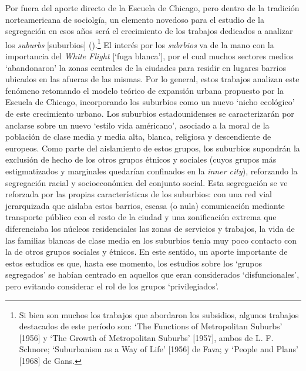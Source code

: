 \documentclass[
  spanish,
  a4paper,%
  chapterprefix=true,%
  DIV=calc,%
  twoside]{scrbook}%
\begin{document}
Por fuera del aporte directo de la Escuela de Chicago, pero dentro de la
tradición norteamericana de sociolgía, un
elemento novedoso para el estudio de la segregación en esos años será el
crecimiento de los trabajos dedicados a analizar los \emph{suburbs}
{[}suburbios{]} ().\footnote{Si bien son muchos los trabajos que abordaron los
  subsidios, algunos trabajos destacados de este período son: `The
  Functions of Metropolitan Suburbs' {[}1956{]} y `The Growth of
  Metropolitan Suburbs' {[}1957{]}, ambos de L. F. Schnore; `Suburbanism
  as a Way of Life' {[}1956{]} de Fava; y `People and Plans' {[}1968{]} de
  Gans.} El
interés por los \emph{subrbios} va de la mano con la importancia del \emph{White
Flight} {[}`fuga blanca'{]}, por el cual muchos sectores medios
`abandonaron' la zonas centrales de la ciudades para residir en lugares
barrios ubicados en las afueras de las mismas. Por lo general, estos
trabajos analizan este fenómeno retomando el modelo teórico de expansión
urbana propuesto por la Escuela de Chicago, incorporando los suburbios
como un nuevo `nicho ecológico' de este crecimiento urbano. Los
suburbios estadounidenses se caracterizarán por anclarse sobre un nuevo
`estilo vida américano', asociado a la moral de la población de clase
media y media alta, blanca, religiosa y descendiente de europeos. Como
parte del aislamiento de estos grupos, los suburbios supondrán la
exclusión de hecho de los otros grupos étnicos y sociales (cuyos grupos
más estigmatizados y marginales quedarían confinados en la \emph{inner
city}), reforzando la segregación racial y socioeconómica del conjunto
social. Esta segregación se ve reforzada por las propias características
de los suburbios: con una red vial jerarquizada que aislaba estos
barrios, escasa (o nula) comunicación mediante transporte público con el
resto de la ciudad y una zonificación extrema que diferenciaba los
núcleos residenciales las zonas de servicios y trabajos, la vida de las
familias blancas de clase media en los suburbios tenía muy poco contacto
con la de otros grupos sociales y étnicos. En este sentido, un aporte
importante de estos estudios es que, hasta ese momento, los estudios
sobre los `grupos segregados' se habían centrado en aquellos que eran
considerados `disfuncionales', pero evitando considerar el rol de los
grupos `privilegiados'.
\end{document}
